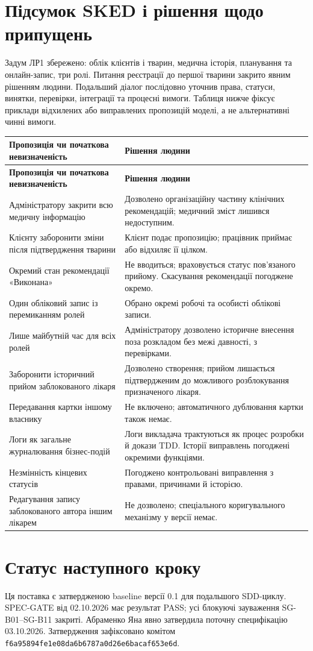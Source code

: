 \documentclass[11pt,a4paper]{article}
\begin{document}
\section{Підсумок SKED і рішення щодо припущень}
Задум ЛР1 збережено: облік клієнтів і тварин, медична історія, планування та онлайн-запис, три ролі. Питання реєстрації до першої тварини закрито явним рішенням людини. Подальший діалог послідовно уточнив права, статуси, винятки, перевірки, інтеграції та процесні вимоги. Таблиця нижче фіксує приклади відхилених або виправлених пропозицій моделі, а не альтернативні чинні вимоги.

\begin{longtable}{>{\raggedright\arraybackslash}p{7.6cm} >{\raggedright\arraybackslash}p{7.6cm}}
\toprule
\textbf{Пропозиція чи початкова невизначеність} & \textbf{Рішення людини} \\ \midrule
\endfirsthead
\toprule
\textbf{Пропозиція чи початкова невизначеність} & \textbf{Рішення людини} \\ \midrule
\endhead
\bottomrule
\endfoot
Адміністратору закрити всю медичну інформацію & Дозволено організаційну частину клінічних рекомендацій; медичний зміст лишився недоступним. \\
Клієнту заборонити зміни після підтвердження тварини & Клієнт подає пропозицію; працівник приймає або відхиляє її цілком. \\
Окремий стан рекомендації «Виконана» & Не вводиться; враховується статус пов’язаного прийому. Скасування рекомендації погоджене окремо. \\
Один обліковий запис із перемиканням ролей & Обрано окремі робочі та особисті облікові записи. \\
Лише майбутній час для всіх ролей & Адміністратору дозволено історичне внесення поза розкладом без межі давності, з перевірками. \\
Заборонити історичний прийом заблокованого лікаря & Дозволено створення; прийом лишається підтвердженим до можливого розблокування призначеного лікаря. \\
Передавання картки іншому власнику & Не включено; автоматичного дублювання картки також немає. \\
Логи як загальне журналювання бізнес-подій & Логи викладача трактуються як процес розробки й докази TDD. Історії виправлень погоджені окремими функціями. \\
Незмінність кінцевих статусів & Погоджено контрольовані виправлення з правами, причинами й історією. \\
Редагування запису заблокованого автора іншим лікарем & Не дозволено; спеціального коригувального механізму у версії немає. \\
\end{longtable}

\section{Статус наступного кроку}
Ця поставка є затвердженою baseline версії 0.1 для подальшого SDD-циклу. SPEC-GATE від 02.10.2026 має результат PASS; усі блокуючі зауваження SG-B01–SG-B11 закриті. Абраменко Яна явно затвердила поточну специфікацію 03.10.2026. Затвердження зафіксовано комітом \texttt{f6a95894fe1e08da6b6787a0d26e6bacaf653e6d}.
\end{document}
